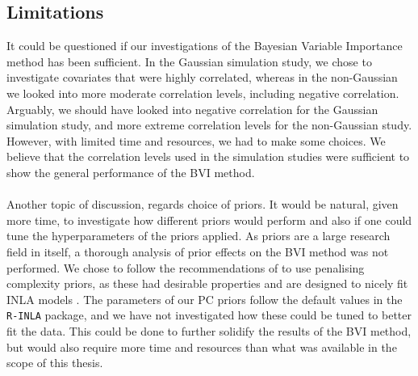 \subsection*{Limitations}
It could be questioned if our investigations of the Bayesian Variable Importance method has been sufficient. In the Gaussian simulation study, we chose to investigate covariates that were highly correlated, whereas in the non-Gaussian we looked into more moderate correlation levels, including negative correlation. Arguably, we should have looked into negative correlation for the Gaussian simulation study, and more extreme correlation levels for the non-Gaussian study. However, with limited time and resources, we had to make some choices. We believe that the correlation levels used in the simulation studies were sufficient to show the general performance of the BVI method.
\\
\\
Another topic of discussion, regards choice of priors. It would be natural, given more time, to investigate how different priors would perform and also if one could tune the hyperparameters of the priors applied. As priors are a large research field in itself, a thorough analysis of prior effects on the BVI method was not performed. We chose to follow the recommendations of \citet{simpson2017penalising} to use penalising complexity priors, as these had desirable properties and are designed to nicely fit INLA models \citep{simpson2017penalising}. The parameters of our PC priors follow the default values in the \texttt{R-INLA} package, and we have not investigated how these could be tuned to better fit the data. This could be done to further solidify the results of the BVI method, but would also require more time and resources than what was available in the scope of this thesis. 
\\
\\

